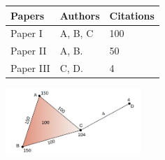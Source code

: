 \begin{table}
\begin{center}
\begin{minipage}{0.4\linewidth}	 
 
  \label{Simplices-coauthor}
  \centering
  \begin{tabular}{lll}
    \cmidrule(r){1-3}
    Papers   & Authors     & Citations  \\
    \midrule
    Paper I & A, B, C  & 100  \\
    Paper II &  A, B. & 50\\ 
    Paper III & C, D. & 4\\ 
    \bottomrule
  \end{tabular}
\end{minipage} 
\begin{minipage}{0.1\linewidth}
\begin{center}
\end{center}
\end{minipage} \hspace{0.0cm}
\begin{minipage}{0.4\linewidth}
\begin{center}
\includegraphics[height=2.5cm]{./figures/cc.png}       
\end{center}
\end{minipage} 
\end{center}
\end{table} 
